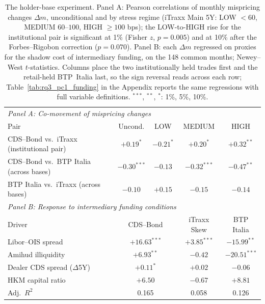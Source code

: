 \begin{table}[t]
\centering
\caption{The holder-base experiment. Panel A: Pearson correlations of monthly
mispricing changes $\Delta m$, unconditional and by stress regime (iTraxx Main
5Y: LOW $<60$, MEDIUM $60$--$100$, HIGH $\geq 100$ bps); the LOW-to-HIGH rise
for the institutional pair is significant at 1\% (Fisher $z$, $p=0.005$) and
at 10\% after the Forbes--Rigobon correction ($p=0.070$). Panel B: each
$\Delta m$ regressed on proxies for the shadow cost of intermediary funding,
on the 148 common months; Newey--West $t$-statistics. Columns place the two institutionally
held trades first and the retail-held BTP~Italia last, so the sign reversal
reads across each row; Table~\ref{tab:rq3_pc1_funding} in the Appendix
reports the same regressions with full variable definitions. $^{***}$,
$^{**}$, $^{*}$: 1\%, 5\%, 10\%.
\label{tab:smc}}
\small
\begin{tabular}{lcccc}
\toprule
\multicolumn{5}{l}{\emph{Panel A: Co-movement of mispricing changes}}\\
Pair & Uncond. & LOW & MEDIUM & HIGH \\
\midrule
CDS--Bond vs.\ iTraxx (institutional pair) & $+0.19^{*}$ & $-0.21^{*}$ & $+0.20^{*}$ & $+0.32^{**}$ \\
CDS--Bond vs.\ BTP Italia (across bases)   & $-0.30^{***}$ & $-0.13$ & $-0.32^{***}$ & $-0.47^{**}$ \\
BTP Italia vs.\ iTraxx (across bases)      & $-0.10$ & $+0.15$ & $-0.15$ & $-0.14$ \\
\midrule
\multicolumn{5}{l}{\emph{Panel B: Response to intermediary funding conditions}}\\
Driver & \multicolumn{2}{c}{CDS--Bond} & iTraxx Skew & BTP Italia \\
\midrule
Libor--OIS spread        & \multicolumn{2}{c}{$+16.63^{***}$} & $+3.85^{***}$ & $-15.99^{**}$ \\
Amihud illiquidity       & \multicolumn{2}{c}{$+6.93^{**}$}   & $-0.42$       & $-20.51^{***}$ \\
Dealer CDS spread ($\Delta$5Y) & \multicolumn{2}{c}{$+0.11^{*}$} & $+0.02$   & $-0.06$ \\
HKM capital ratio        & \multicolumn{2}{c}{$+6.50$}        & $-0.67$       & $+8.81$ \\
Adj.\ $R^2$              & \multicolumn{2}{c}{0.165}          & 0.058         & 0.126 \\
\bottomrule
\end{tabular}
\end{table}
